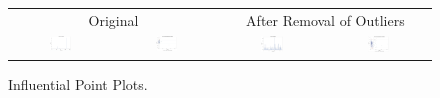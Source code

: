 \documentclass[11pt]{scrartcl} %
\begin{document}
\begin{figure}[H] %
	\centering
	\begin{tabular}{p{} p{}p{}p{}}
\hline	
	\multicolumn{2}{|c|}{Original} &  \multicolumn{2}{|c|}{After Removal of Outliers} \\
		\multicolumn{1}{|c}{\includegraphics[width=0.23\textwidth]{../graphics/A1Cooks1}} &
		\multicolumn{1}{c|}{\includegraphics[width=0.23\textwidth]{../graphics/A1Lev1}} &
		\multicolumn{1}{|c}{\includegraphics[width=0.23\textwidth]{../graphics/A1Cooks2}} &
		\multicolumn{1}{c|}{\includegraphics[width=0.23\textwidth]{../graphics/A1Lev2}}\\
		\hline
	\end{tabular}		
	\caption{Influential Point Plots.}
	\label{fig:A1IP}
\end{figure}
\end{document}

